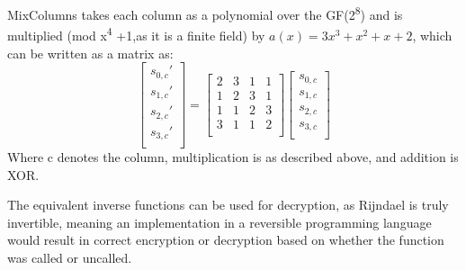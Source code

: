 \documentclass[a4paper, openany]{book}
\begin{document}
\begin{abstact}
MixColumns takes each column as a polynomial over the GF(2\textsuperscript{8}) and is multiplied (mod x\textsuperscript{4} +1,as it is a finite field) by \(a(x) = 3x^3 + x^2 + x + 2\), which can be written as a matrix as:
\[
\begin{bmatrix}
 s_{0,c}' \\
 s_{1,c}' \\
 s_{2,c}' \\
 s_{3,c}' \\
\end{bmatrix}=
\begin{bmatrix}
 2 & 3 & 1 & 1 \\
 1 & 2 & 3 & 1 \\
 1 & 1 & 2 & 3 \\
 3 & 1 & 1 & 2 \\
\end{bmatrix}
\begin{bmatrix}
 s_{0,c} \\
 s_{1,c} \\
 s_{2,c} \\
 s_{3,c} \\
\end{bmatrix}
\]
Where c denotes the column, multiplication is as described above, and addition is XOR.

The equivalent inverse functions can be used for decryption, as Rijndael is truly invertible, meaning an implementation in a reversible programming language would result in correct encryption or decryption based on whether the function was called or uncalled.


\end{abstact}
\end{document}
